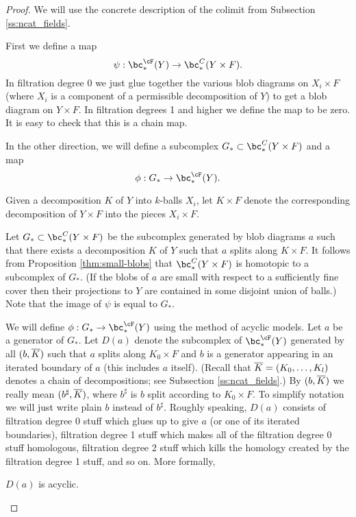 \begin{proof}%
We will use the concrete description of the colimit from Subsection \ref{ss:ncat_fields}.

First we define a map 
\[
	\psi: \bc_*^\cF(Y) \to \bc_*^C(Y\times F) .
\]
In filtration degree 0 we just glue together the various blob diagrams on $X_i\times F$
(where $X_i$ is a component of a permissible decomposition of $Y$) to get a blob diagram on
$Y\times F$.
In filtration degrees 1 and higher we define the map to be zero.
It is easy to check that this is a chain map.

In the other direction, we will define a subcomplex $G_*\sub \bc_*^C(Y\times F)$
and a map
\[
	\phi: G_* \to \bc_*^\cF(Y) .
\]

Given a decomposition $K$ of $Y$ into $k$-balls $X_i$, let $K\times F$ denote the corresponding
decomposition of $Y\times F$ into the pieces $X_i\times F$.

Let $G_*\sub \bc_*^C(Y\times F)$ be the subcomplex generated by blob diagrams $a$ such that there
exists a decomposition $K$ of $Y$ such that $a$ splits along $K\times F$.
It follows from Proposition \ref{thm:small-blobs} that $\bc_*^C(Y\times F)$ is homotopic to a subcomplex of $G_*$.
(If the blobs of $a$ are small with respect to a sufficiently fine cover then their
projections to $Y$ are contained in some disjoint union of balls.)
Note that the image of $\psi$ is equal to $G_*$.

We will define $\phi: G_* \to \bc_*^\cF(Y)$ using the method of acyclic models.
Let $a$ be a generator of $G_*$.
Let $D(a)$ denote the subcomplex of $\bc_*^\cF(Y)$ generated by all $(b, \overline{K})$
such that $a$ splits along $K_0\times F$ and $b$ is a generator appearing
in an iterated boundary of $a$ (this includes $a$ itself).
(Recall that $\overline{K} = (K_0,\ldots,K_l)$ denotes a chain of decompositions;
see Subsection \ref{ss:ncat_fields}.)
By $(b, \overline{K})$ we really mean $(b^\sharp, \overline{K})$, where $b^\sharp$ is 
$b$ split according to $K_0\times F$.
To simplify notation we will just write plain $b$ instead of $b^\sharp$.
Roughly speaking, $D(a)$ consists of filtration degree 0 stuff which glues up to give
$a$ (or one of its iterated boundaries), filtration degree 1 stuff which makes all of the filtration degree 0 stuff homologous, 
filtration degree 2 stuff which kills the homology created by the 
filtration degree 1 stuff, and so on.
More formally,
 
\begin{lemma}
$D(a)$ is acyclic.
\end{lemma}


\end{proof}
